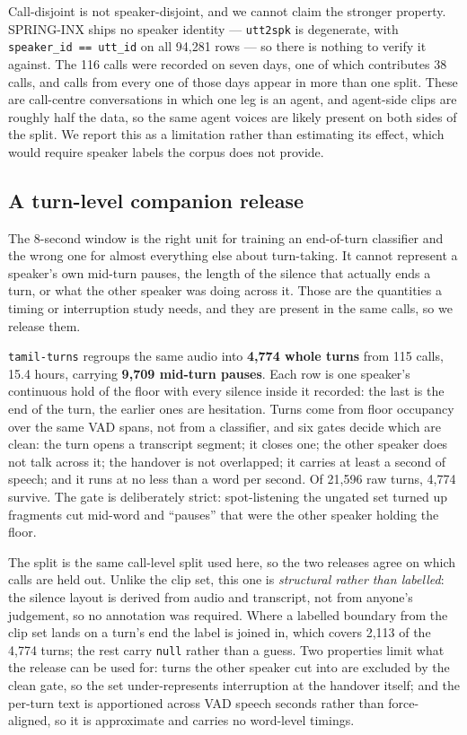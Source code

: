 \documentclass[11pt]{article}
\begin{document}
Call-disjoint is not speaker-disjoint, and we cannot claim the stronger property.
SPRING-INX ships no speaker identity --- \texttt{utt2spk} is degenerate, with
\texttt{speaker\_id == utt\_id} on all 94,281 rows --- so there is nothing to
verify it against. The 116 calls were recorded on seven days, one of which
contributes 38 calls, and calls from every one of those days appear in more than
one split. These are call-centre conversations in which one leg is an agent, and
agent-side clips are roughly half the data, so the same agent voices are likely
present on both sides of the split. We report this as a limitation rather than
estimating its effect, which would require speaker labels the corpus does not
provide.

\subsection{A turn-level companion release}
\label{sec:turns}

The 8-second window is the right unit for training an end-of-turn classifier and
the wrong one for almost everything else about turn-taking. It cannot represent a
speaker's own mid-turn pauses, the length of the silence that actually ends a
turn, or what the other speaker was doing across it. Those are the quantities a
timing or interruption study needs, and they are present in the same calls, so we
release them.

\texttt{tamil-turns} regroups the same audio into \textbf{4,774 whole turns} from
115 calls, 15.4 hours, carrying \textbf{9,709 mid-turn pauses}. Each row is one
speaker's continuous hold of the floor with every silence inside it recorded: the
last is the end of the turn, the earlier ones are hesitation. Turns come from
floor occupancy over the same VAD spans, not from a classifier, and six gates
decide which are clean: the turn opens a transcript segment; it closes one; the
other speaker does not talk across it; the handover is not overlapped; it carries
at least a second of speech; and it runs at no less than a word per second. Of
21,596 raw turns, 4,774 survive. The gate is deliberately strict: spot-listening the ungated
set turned up fragments cut mid-word and ``pauses'' that were the other speaker
holding the floor.

The split is the same call-level split used here, so the two releases agree on
which calls are held out. Unlike the clip set, this one is \emph{structural
rather than labelled}: the silence layout is derived from audio and transcript,
not from anyone's judgement, so no annotation was required. Where a labelled
boundary from the clip set lands on a turn's end the label is joined in, which
covers 2,113 of the 4,774 turns; the rest carry \texttt{null} rather than a
guess. Two properties limit what the release can be used for: turns the other
speaker cut into are excluded by the clean gate, so the set under-represents
interruption at the handover itself; and the per-turn text is apportioned across
VAD speech seconds rather than force-aligned, so it is approximate and carries no
word-level timings.
\end{document}
